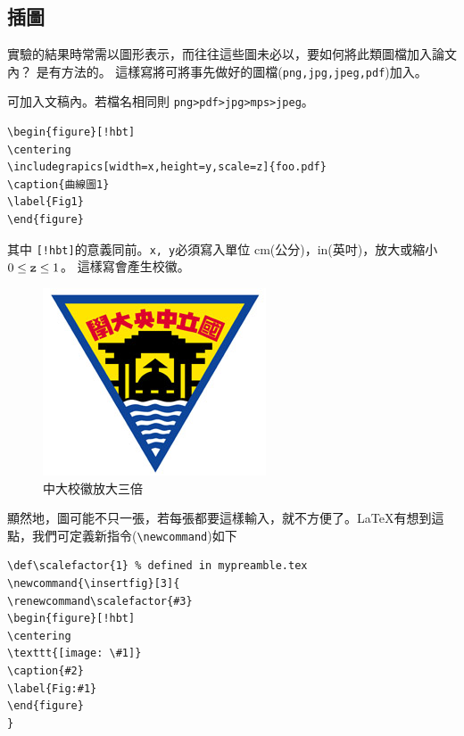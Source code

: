 \subsection{插圖}
實驗的結果時常需以圖形表示，而往往這些圖未必以，要如何將此類圖檔加入論文內？ 是有方法的。 這樣寫將可將事先做好的圖檔({\tt png,jpg,jpeg,pdf})加入。 

可加入文稿內。若檔名相同則
{\tt png>pdf>jpg>mps>jpeg}。
\begin{Verbatim}[frame=single,firstline=1,label=Every figure]
\begin{figure}[!hbt]
\centering
\includegrapics[width=x,height=y,scale=z]{foo.pdf}  
\caption{曲線圖1}
\label{Fig1}
\end{figure}
\end{Verbatim}
其中 {\tt[!hbt]}的意義同前。{\tt x, y}必須寫入單位 cm(公分)，in(英吋)，放大或縮小 $0 \le {\tt z} \le 1$。
這樣寫會產生校徽。
\begin{figure}[!hbt]
\centering
\includegraphics[scale=3]{NCUlogo} 
\caption{中大校徽放大三倍}
\label{Fig1}
\end{figure}%
顯然地，圖可能不只一張，若每張都要這樣輸入，就不方便了。\LaTeX{}有想到這點，我們可定義新指令({\tt \textbackslash newcommand})如下\\ 
\begin{Verbatim}[frame=single,firstline=1,label={Macro with parameters}]
\def\scalefactor{1} % defined in mypreamble.tex
\newcommand{\insertfig}[3]{
\renewcommand\scalefactor{#3}
\begin{figure}[!hbt]
\centering
\texttt{[image: \#1]}
\caption{#2}
\label{Fig:#1}
\end{figure}
}
\end{Verbatim}

